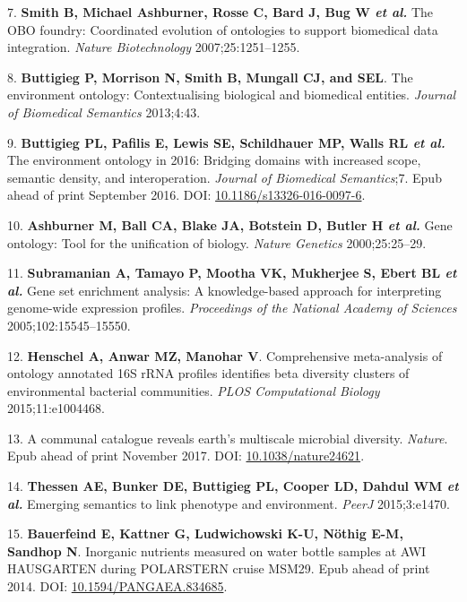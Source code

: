 \documentclass[]{article}
\begin{document}
\leavevmode\hypertarget{ref-Smith_2007}{}%
7. \textbf{Smith B, Michael Ashburner, Rosse C, Bard J, Bug W \emph{et
al.}} The OBO foundry: Coordinated evolution of ontologies to support
biomedical data integration. \emph{Nature Biotechnology}
2007;25:1251--1255.

\leavevmode\hypertarget{ref-Buttigieg_2013}{}%
8. \textbf{Buttigieg P, Morrison N, Smith B, Mungall CJ, and SEL}. The
environment ontology: Contextualising biological and biomedical
entities. \emph{Journal of Biomedical Semantics} 2013;4:43.

\leavevmode\hypertarget{ref-Buttigieg_2016}{}%
9. \textbf{Buttigieg PL, Pafilis E, Lewis SE, Schildhauer MP, Walls RL
\emph{et al.}} The environment ontology in 2016: Bridging domains with
increased scope, semantic density, and interoperation. \emph{Journal of
Biomedical Semantics};7. Epub ahead of print September 2016. DOI:
\href{https://doi.org/10.1186/s13326-016-0097-6}{10.1186/s13326-016-0097-6}.

\leavevmode\hypertarget{ref-Ashburner_2000}{}%
10. \textbf{Ashburner M, Ball CA, Blake JA, Botstein D, Butler H
\emph{et al.}} Gene ontology: Tool for the unification of biology.
\emph{Nature Genetics} 2000;25:25--29.

\leavevmode\hypertarget{ref-Subramanian_2005}{}%
11. \textbf{Subramanian A, Tamayo P, Mootha VK, Mukherjee S, Ebert BL
\emph{et al.}} Gene set enrichment analysis: A knowledge-based approach
for interpreting genome-wide expression profiles. \emph{Proceedings of
the National Academy of Sciences} 2005;102:15545--15550.

\leavevmode\hypertarget{ref-Henschel_2015}{}%
12. \textbf{Henschel A, Anwar MZ, Manohar V}. Comprehensive
meta-analysis of ontology annotated 16S rRNA profiles identifies beta
diversity clusters of environmental bacterial communities. \emph{PLOS
Computational Biology} 2015;11:e1004468.

\leavevmode\hypertarget{ref-Thompson_2017}{}%
13. A communal catalogue reveals earth's multiscale microbial diversity.
\emph{Nature}. Epub ahead of print November 2017. DOI:
\href{https://doi.org/10.1038/nature24621}{10.1038/nature24621}.

\leavevmode\hypertarget{ref-Thessen_2015}{}%
14. \textbf{Thessen AE, Bunker DE, Buttigieg PL, Cooper LD, Dahdul WM
\emph{et al.}} Emerging semantics to link phenotype and environment.
\emph{PeerJ} 2015;3:e1470.

\leavevmode\hypertarget{ref-bauerfeind2014inmo}{}%
15. \textbf{Bauerfeind E, Kattner G, Ludwichowski K-U, Nöthig E-M,
Sandhop N}. Inorganic nutrients measured on water bottle samples at AWI
HAUSGARTEN during POLARSTERN cruise MSM29. Epub ahead of print 2014.
DOI:
\href{https://doi.org/10.1594/PANGAEA.834685}{10.1594/PANGAEA.834685}.
\end{document}
